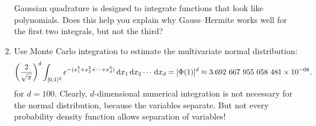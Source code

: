 \documentclass[11pt,letterpaper]{article}
\begin{document}
\begin{enumerate}
Gaussian quadrature is designed to integrate functions that look like polynomials. Does this help you explain why Gauss--Hermite works well for the first two integrals, but not the third?

\item Use Monte Carlo integration to estimate the multivariate normal distribution:
\[
\left(\dfrac{2}{\sqrt{\pi}}\right)^d\int_{[0,1]^{d}} e^{-(x_1^2+x_2^2+\cdots+x_d^2)}{\rm\,d} x_1{\rm\,d} x_2\cdots{\rm\,d} x_d = [\Phi(1)]^d \approx 3.692~667~955~058~481\times10^{-08},
\]
for $d=100$. Clearly, $d$-dimensional numerical integration is not necessary for the normal distribution, because the variables separate. But not every probability density function allows separation of variables!

\end{enumerate}
\end{document}
